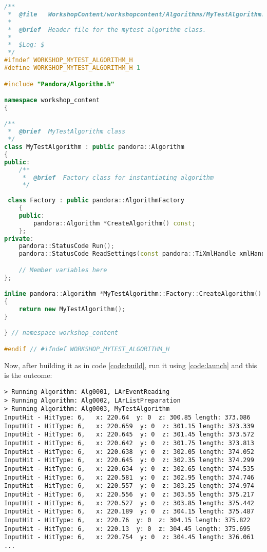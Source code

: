 \begin{lstlisting}[language=C++, caption=Version of MyTestAlgorithms.h to sort hits regarding z-coordinate]
/**
 *  @file   WorkshopContent/workshopcontent/Algorithms/MyTestAlgorithm.h
 * 
 *  @brief  Header file for the mytest algorithm class.
 * 
 *  $Log: $
 */
#ifndef WORKSHOP_MYTEST_ALGORITHM_H
#define WORKSHOP_MYTEST_ALGORITHM_H 1

#include "Pandora/Algorithm.h"

namespace workshop_content
{

/**
 *  @brief  MyTestAlgorithm class
 */
class MyTestAlgorithm : public pandora::Algorithm
{
public:
    /**
     *  @brief  Factory class for instantiating algorithm
     */
  
 class Factory : public pandora::AlgorithmFactory
    {
    public:
        pandora::Algorithm *CreateAlgorithm() const;
    };
private:
    pandora::StatusCode Run();
    pandora::StatusCode ReadSettings(const pandora::TiXmlHandle xmlHandle);

    // Member variables here
};

inline pandora::Algorithm *MyTestAlgorithm::Factory::CreateAlgorithm() const
{
    return new MyTestAlgorithm();
}

} // namespace workshop_content

#endif // #ifndef WORKSHOP_MYTEST_ALGORITHM_H
\end{lstlisting}

Now, after building it as in code \ref{code:build}, run it using \ref{code:launch} and this is the outcome:

\begin{lstlisting}[caption=Python example]
> Running Algorithm: Alg0001, LArEventReading
> Running Algorithm: Alg0002, LArListPreparation
> Running Algorithm: Alg0003, MyTestAlgorithm
InputHit - HitType: 6,   x: 220.64  y: 0  z: 300.85 length: 373.086
InputHit - HitType: 6,   x: 220.659  y: 0  z: 301.15 length: 373.339
InputHit - HitType: 6,   x: 220.645  y: 0  z: 301.45 length: 373.572
InputHit - HitType: 6,   x: 220.642  y: 0  z: 301.75 length: 373.813
InputHit - HitType: 6,   x: 220.638  y: 0  z: 302.05 length: 374.052
InputHit - HitType: 6,   x: 220.645  y: 0  z: 302.35 length: 374.299
InputHit - HitType: 6,   x: 220.634  y: 0  z: 302.65 length: 374.535
InputHit - HitType: 6,   x: 220.581  y: 0  z: 302.95 length: 374.746
InputHit - HitType: 6,   x: 220.557  y: 0  z: 303.25 length: 374.974
InputHit - HitType: 6,   x: 220.556  y: 0  z: 303.55 length: 375.217
InputHit - HitType: 6,   x: 220.527  y: 0  z: 303.85 length: 375.442
InputHit - HitType: 6,   x: 220.189  y: 0  z: 304.15 length: 375.487
InputHit - HitType: 6,   x: 220.76  y: 0  z: 304.15 length: 375.822
InputHit - HitType: 6,   x: 220.13  y: 0  z: 304.45 length: 375.695
InputHit - HitType: 6,   x: 220.754  y: 0  z: 304.45 length: 376.061
...
\end{lstlisting}

